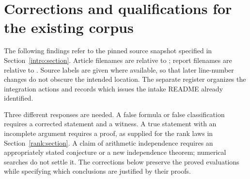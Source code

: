 \section{Corrections and qualifications for the existing corpus}
\label{audit:section}

The following findings refer to the pinned source snapshot specified
in Section~\ref{intro:section}. Article filenames are relative to
; report filenames are
relative to .
Source labels are given where available, so that later line-number
changes do not obscure the intended location.
The separate  register organizes the integration
actions and records which issues the intake README already identified.

Three different responses are needed. A false formula or false
classification requires a corrected statement and a witness. A true
statement with an incomplete argument requires a proof, as supplied
for the rank laws in Section~\ref{rank:section}. A claim of arithmetic
independence requires an appropriately stated conjecture or a new
independence theorem; numerical searches do not settle it.
The corrections below preserve the proved evaluations while specifying
which conclusions are justified by their proofs.
